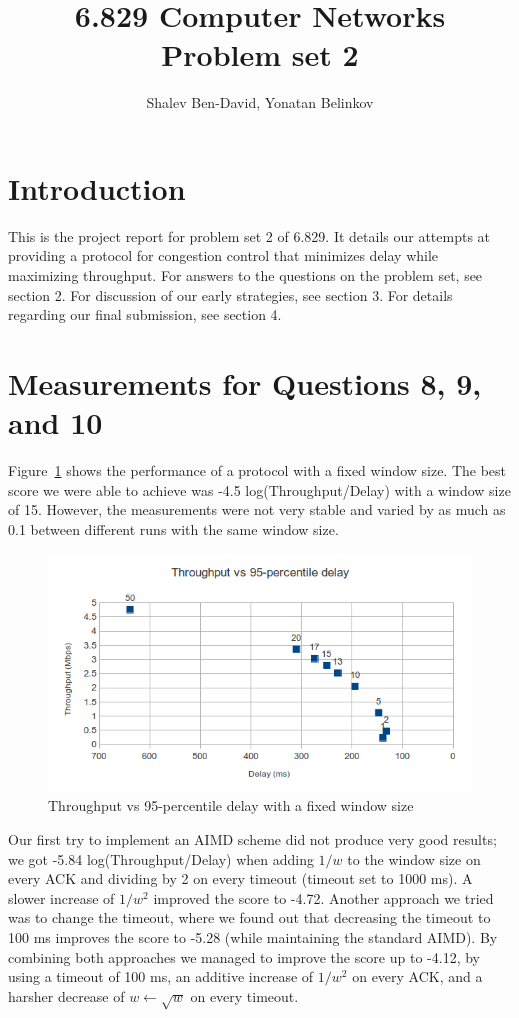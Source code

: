 \documentclass[a4paper,10pt]{article}
\title{6.829 Computer Networks\\Problem set 2}
\author{Shalev Ben-David, Yonatan Belinkov}
\begin{document}
\maketitle

\section{Introduction}
This is the project report for problem set 2 of 6.829. It details our attempts at providing a
protocol for congestion control that minimizes delay while maximizing throughput.
For answers to the questions on the problem set, see section 2. For discussion of our early strategies,
see section 3. For details regarding our final submission, see section 4.

\section{Measurements for Questions 8, 9, and 10}
Figure~\ref{fig:fixedWindow} shows the performance of a protocol with a fixed window size. 
The best score we were able to achieve was -4.5 log(Throughput/Delay) with a window 
size of 15. However, the measurements were not very stable and varied by as much 
as 0.1 between different runs with the same window size. 

\begin{figure}[h]
 \begin{center}
  \includegraphics[width=1\textwidth]{fixedWindow.png}
  \end{center}
 \caption{Throughput vs 95-percentile delay with a fixed window size}
 \label{fig:fixedWindow}
\end{figure}

Our first try to implement an AIMD scheme did not produce very good results; we got
-5.84 log(Throughput/Delay) when adding $ 1/w $ to the window size on
every ACK and dividing by 2 on every timeout (timeout set to 1000 ms). A slower 
increase of $ 1/w^2 $ improved the score to -4.72. Another approach we tried was to
change the timeout, where we found out that decreasing the timeout to 100 ms improves
the score to -5.28 (while maintaining the standard AIMD). By combining both approaches
we managed to improve the score up to -4.12, by using a timeout of 100 ms, an additive 
increase of $ 1/w^2 $ on every ACK, and a harsher decrease of $ w \leftarrow \sqrt{w} $ 
on every timeout.
\end{document}
